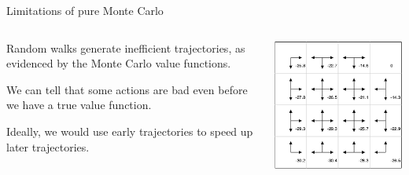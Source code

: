 \documentclass[9pt]{beamer}
\begin{document}
\begin{frame}{Limitations of pure Monte Carlo}

\begin{columns}
\begin{column}{0.6\textwidth}
Random walks generate inefficient trajectories, as evidenced by the Monte Carlo value functions.

\bigskip
We can tell that some actions are bad even before we have a true value function.

\bigskip
Ideally, we would use early trajectories to speed up later trajectories.

\end{column}

\begin{column}{0.4\textwidth}
	\begin{center}
		\includegraphics[width=\textwidth]{figures/gridworld1a.png}	


\end{center}
\end{column}
\end{columns}
\end{frame}
\end{document}

